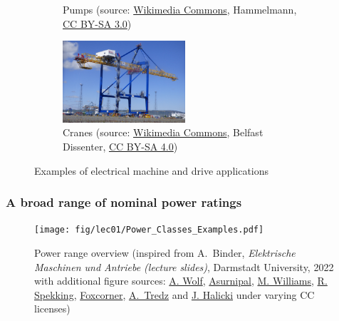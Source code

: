 \begin{frame}
\begin{figure}
\begin{subfigure}[b]{0.49\textwidth}
			\caption{Pumps (source: \href{https://commons.wikimedia.org/wiki/File:Hammelmann_Stationary_unit_with_electric_motor.jpg}{Wikimedia Commons}, Hammelmann, \href{https://creativecommons.org/licenses/by-sa/3.0/deed.en}{CC BY-SA 3.0})}
		\end{subfigure}
		\hfill
		\begin{subfigure}[b]{0.49\textwidth}
			\centering
			\includegraphics[width=0.5\textwidth]{fig/lec01/crane.jpg}
			\caption{Cranes (source: \href{https://commons.wikimedia.org/wiki/File:Hammelmann_Stationary_unit_with_electric_motor.jpg}{Wikimedia Commons}, Belfast Dissenter, \href{https://creativecommons.org/licenses/by-sa/4.0/deed.en}{CC BY-SA 4.0})}
		\end{subfigure}
		\caption*{Examples of electrical machine and drive applications} 
        \label{fig:examples_machine_drives_02}
	\end{figure}
\end{frame}

\begin{frame}
	\frametitle{A broad range of nominal power ratings}
	\vspace{-0.1cm}
	\begin{figure}
		\centering
		\texttt{[image: fig/lec01/Power\_Classes\_Examples.pdf]}
		\caption{Power range overview (inspired  from A.~Binder, \textit{Elektrische Maschinen und Antriebe (lecture slides)}, Darmstadt University, 2022 with additional figure sources: \href{https://www.flickr.com/photos/arthurwolf/5393520058/}{A. Wolf}, \href{https://commons.wikimedia.org/wiki/File:Wald_am_Arlberg-OeBB_Spullersee_power_plant-M1-Rotor-11ASD.jpg}{Asurnipal}, \href{https://www.flickr.com/photos/mouser-nerdbot/7042785635}{M. Williams}, \href{https://de.m.wikipedia.org/wiki/Datei:Stick_blender_Electrolux_AEG_HB_9807_-_stator_of_the_electric_motor-4313.jpg}{R. Spekking}, \href{https://commons.wikimedia.org/wiki/File:Electric_motor_and_transmission_in_a_truck.jpg}{Foxcorner}, \href{https://commons.wikimedia.org/wiki/File:E-bike_electric_motor_shimano_ep_8.jpg}{A.~Tredz} and \href{https://commons.wikimedia.org/wiki/File:2023_Corsair_SP120_RGB_Elite.jpg}{J. Halicki} under varying CC licenses) }
		\label{Power_Classes_Examples}
	\end{figure}
\end{frame}

